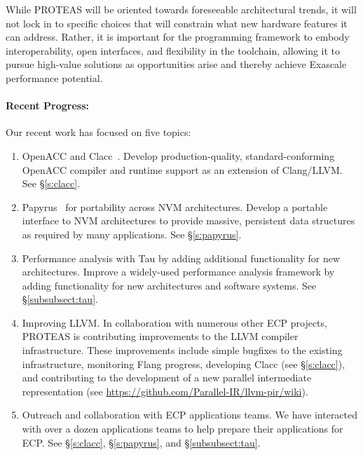 While PROTEAS will be oriented towards foreseeable architectural trends, it will not lock in to specific choices that will constrain what new hardware features it can address. Rather, it is important for the programming framework to embody interoperability, open interfaces, and flexibility in the toolchain, allowing it to pursue high-value solutions as opportunities arise and thereby achieve Exascale performance potential. 

\paragraph{Recent Progress:}

Our recent work has focused on five topics:

\begin{enumerate}
    
    \item OpenACC and Clacc~\cite{clacc:2018:denny}. Develop production-quality, standard-conforming OpenACC compiler and runtime support as an extension of Clang/LLVM. See \S\ref{s:clacc}.
    
    \item Papyrus~\cite{Kim:2017:DIP,Kim:2017:PHP} for portability across NVM architectures. 
    Develop a portable interface to NVM architectures to provide massive, persistent data structures as required by many applications.
    See \S\ref{s:papyrus}.
    
    \item Performance analysis with Tau by adding additional functionality for new architectures. 
    Improve a widely-used performance analysis framework by adding functionality for new architectures and software systems.
    See \S\ref{subsubsect:tau}.

    \item Improving LLVM. In collaboration with numerous other ECP projects, PROTEAS is contributing improvements to the LLVM compiler infrastructure. These improvements include simple bugfixes to the existing infrastructure, monitoring Flang progress, developing Clacc (see \S\ref{s:clacc}), and contributing to the development of a new parallel intermediate representation (see \url{https://github.com/Parallel-IR/llvm-pir/wiki}).
    
    \item Outreach and collaboration with ECP applications teams. 
    We have interacted with over a dozen applications teams to help prepare their applications for ECP. See \S\ref{s:clacc}, \S\ref{s:papyrus}, and \S\ref{subsubsect:tau}.
    
\end{enumerate}

